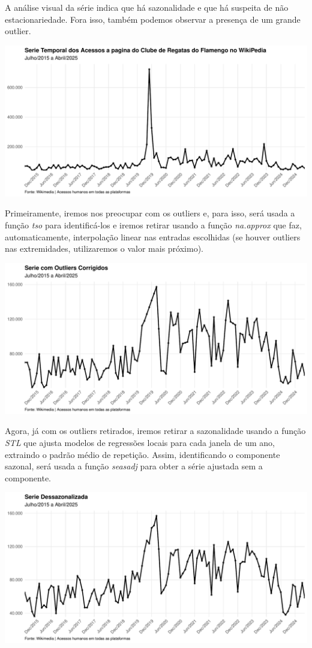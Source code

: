 \documentclass[
]{article}
\begin{document}
A análise visual da série indica que há sazonalidade e que há suspeita
de não estacionariedade. Fora isso, também podemos observar a presença
de um grande outlier.

\includegraphics{analise-series-temporais-flamengo_files/figure-latex/unnamed-chunk-3-1.pdf}

\newpage

Primeiramente, iremos nos preocupar com os outliers e, para isso, será
usada a função \emph{tso} para identificá-los e iremos retirar usando a
função \emph{na.approx} que faz, automaticamente, interpolação linear
nas entradas escolhidas (se houver outliers nas extremidades,
utilizaremos o valor mais próximo).

\includegraphics{analise-series-temporais-flamengo_files/figure-latex/unnamed-chunk-4-1.pdf}

Agora, já com os outliers retirados, iremos retirar a sazonalidade
usando a função \emph{STL} que ajusta modelos de regressões locais para
cada janela de um ano, extraindo o padrão médio de repetição. Assim,
identificando o componente sazonal, será usada a função \emph{seasadj}
para obter a série ajustada sem a componente.

\includegraphics{analise-series-temporais-flamengo_files/figure-latex/unnamed-chunk-5-1.pdf}
\end{document}

